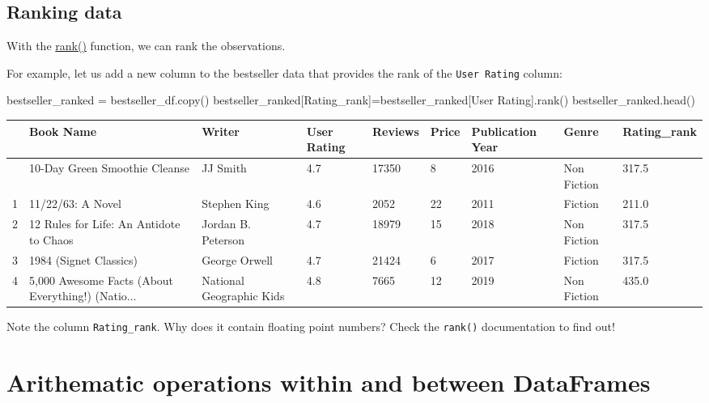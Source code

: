 \documentclass[
  letterpaper,
  DIV=11,
  numbers=noendperiod]{scrreprt}
\newenvironment{Shaded}{\begin{snugshade}}{\end{snugshade}}
\newcommand{\NormalTok}[1]{\textcolor[rgb]{0.00,0.23,0.31}{#1}}
\newcommand{\OperatorTok}[1]{\textcolor[rgb]{0.37,0.37,0.37}{#1}}
\newcommand{\StringTok}[1]{\textcolor[rgb]{0.13,0.47,0.30}{#1}}
\begin{document}
\hypertarget{ranking-data}{%
\subsection{Ranking data}\label{ranking-data}}

With the
\href{https://pandas.pydata.org/docs/reference/api/pandas.DataFrame.rank.html}{rank()}
function, we can rank the observations.

For example, let us add a new column to the bestseller data that
provides the rank of the \texttt{User\ Rating} column:

\begin{Shaded}
\begin{Highlighting}[]
\NormalTok{bestseller\_ranked }\OperatorTok{=}\NormalTok{ bestseller\_df.copy()}
\NormalTok{bestseller\_ranked[}\StringTok{\textquotesingle{}Rating\_rank\textquotesingle{}}\NormalTok{]}\OperatorTok{=}\NormalTok{bestseller\_ranked[}\StringTok{\textquotesingle{}User Rating\textquotesingle{}}\NormalTok{].rank()}
\NormalTok{bestseller\_ranked.head()}
\end{Highlighting}
\end{Shaded}

\begin{longtable}[]{@{}lllllllll@{}}
\toprule\noalign{}
& Book Name & Writer & User Rating & Reviews & Price & Publication Year
& Genre & Rating\_rank \\
\midrule\noalign{}
\endhead
\bottomrule\noalign{}
\endlastfoot
0 & 10-Day Green Smoothie Cleanse & JJ Smith & 4.7 & 17350 & 8 & 2016 &
Non Fiction & 317.5 \\
1 & 11/22/63: A Novel & Stephen King & 4.6 & 2052 & 22 & 2011 & Fiction
& 211.0 \\
2 & 12 Rules for Life: An Antidote to Chaos & Jordan B. Peterson & 4.7 &
18979 & 15 & 2018 & Non Fiction & 317.5 \\
3 & 1984 (Signet Classics) & George Orwell & 4.7 & 21424 & 6 & 2017 &
Fiction & 317.5 \\
4 & 5,000 Awesome Facts (About Everything!) (Natio... & National
Geographic Kids & 4.8 & 7665 & 12 & 2019 & Non Fiction & 435.0 \\
\end{longtable}

Note the column \texttt{Rating\_rank}. Why does it contain floating
point numbers? Check the \texttt{rank()} documentation to find out!

\hypertarget{arithematic-operations-within-and-between-dataframes}{%
\section{Arithematic operations within and between
DataFrames}\label{arithematic-operations-within-and-between-dataframes}}
\end{document}
